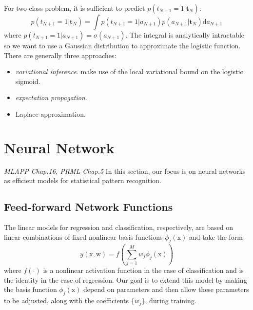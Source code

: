 \documentclass{article}
\newcommand{\mbf}{\mathbf}
\newcommand{\ud}{\mathrm{d}}
\newcommand{\ttt}{\mbf t}
\begin{document}
For two-class problem, it is sufficient to predict $p(t_{N+1}=1|\ttt_N)$:
\begin{equation}
    p(t_{N+1}=1|\ttt_N) = \int p(t_{N+1}=1|a_{N+1})p(a_{N+1}|\ttt_N)\ud a_{N+1}
\end{equation}
where $p(t_{N+1}=1|a_{N+1})=\sigma(a_{N+1})$. The integral is analytically intractable so we want to use a Gaussian distribution to approximate the logistic function. There are generally three approaches:
\begin{itemize}
    \item \emph{variational inference}. make use of the local variational bound on the logistic sigmoid. 
    \item \emph{expectation propagation}.
    \item Laplace approximation. 
\end{itemize}

\section{Neural Network}
\emph{MLAPP Chap.16, PRML Chap.5}
In this section, our focus is on neural networks as efficient models for statistical pattern recognition.
\subsection{Feed-forward Network Functions}
The linear models for regression and classification, respectively, are based on linear combinations of fixed nonlinear basis functions $\phi_j(\mathrm x)$ and take the form
\begin{equation}\label{eq2.4.1}
  y(\mathrm x,\mathrm w) = f(\sum_{j=1}^Mw_j\phi_j(\mathrm x))
\end{equation}
where $f(\cdot)$ is a nonlinear activation function in the case of classification and is the identity in the case of regression. Our goal is to extend this model by making the basis function $\phi_j(\mathrm x)$ depend on parameters and then allow these parameters to be adjusted, along with the coefficients $\{w_j\}$, during training.
\end{document}

